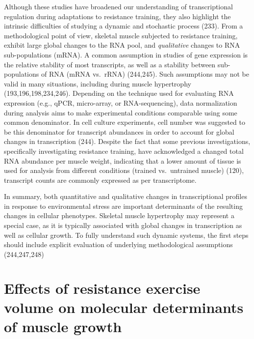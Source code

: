 \documentclass[twoside,10pt]{gihclass} %
\begin{document}
Although these studies have broadened our understanding of transcriptional regulation during adaptations to resistance training, they also highlight the intrinsic difficulties of studying a dynamic and stochastic process
(233).
From a methodological point of view, skeletal muscle subjected to resistance training, exhibit large global changes to the RNA pool, and \emph{qualitative} changes to RNA sub-populations (mRNA).
A common assumption in studies of gene expression is the relative stability of most transcripts, as well as a stability between sub-populations of RNA (mRNA vs.~rRNA)
(244,245).
Such assumptions may not be valid in many situations, including during muscle hypertrophy
(193,196,198,234,246).
Depending on the technique used for evaluating RNA expression (e.g., qPCR, micro-array, or RNA-sequencing), data normalization during analysis aims to make experimental conditions comparable using some common denominator.
In cell culture experiments, cell number was suggested to be this denominator for transcript abundances in order to account for global changes in transcription
(244).
Despite the fact that some previous investigations, specifically investigating resistance training, have acknowledged a changed total RNA abundance per muscle weight, indicating that a lower amount of tissue is used for analysis from different conditions (trained vs.~untrained muscle)
(120),
transcript counts are commonly expressed as per transcriptome.

In summary, both quantitative and qualitative changes in transcriptional profiles in response to environmental stress are important determinants of the resulting changes in cellular phenotypes. Skeletal muscle hypertrophy may represent a special case, as it is typically associated with global changes in transcription as well as cellular growth. To fully understand such dynamic systems, the first steps should include explicit evaluation of underlying methodological assumptions
(244,247,248)

\hypertarget{effects-of-resistance-exercise-volume-on-molecular-determinants-of-muscle-growth}{%
\section{Effects of resistance exercise volume on molecular determinants of muscle growth}\label{effects-of-resistance-exercise-volume-on-molecular-determinants-of-muscle-growth}}
\end{document}

